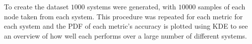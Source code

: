 \documentclass[runningheads]{llncs}
\begin{document}
To create the dataset $1000$ systems were generated, with $10000$ samples of
each node taken from each system.
This procedure was repeated for each metric for each system and the \gls{PDF}
of each metric's accuracy is plotted using \gls{KDE} to see an overview of
how well each performs over a large number of different systems.
\end{document}
